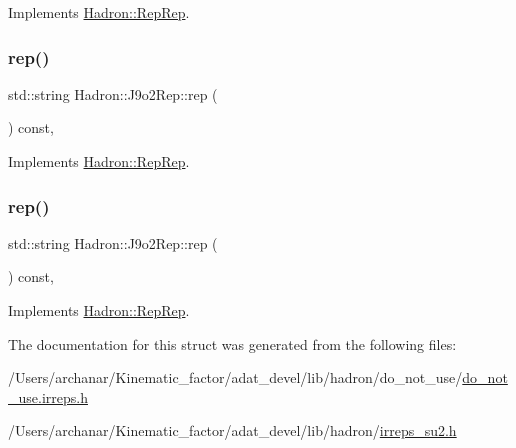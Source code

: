 Implements \mbox{\hyperlink{structHadron_1_1RepRep_ab3213025f6de249f7095892109575fde}{Hadron\+::\+Rep\+Rep}}.

\mbox{\label{structHadron_1_1J9o2Rep_ad83e9b0b6221fcaeeeed5f2653890334}} 
\subsubsection{\texorpdfstring{rep()}{rep()}\hspace{0.1cm}{\footnotesize\ttfamily [2/3]}}
{\footnotesize\ttfamily std\+::string Hadron\+::\+J9o2\+Rep\+::rep (\begin{DoxyParamCaption}{ }\end{DoxyParamCaption}) const\hspace{0.3cm}{\ttfamily [inline]}, {\ttfamily [virtual]}}



Implements \mbox{\hyperlink{structHadron_1_1RepRep_ab3213025f6de249f7095892109575fde}{Hadron\+::\+Rep\+Rep}}.

\mbox{\label{structHadron_1_1J9o2Rep_ad83e9b0b6221fcaeeeed5f2653890334}} 
\subsubsection{\texorpdfstring{rep()}{rep()}\hspace{0.1cm}{\footnotesize\ttfamily [3/3]}}
{\footnotesize\ttfamily std\+::string Hadron\+::\+J9o2\+Rep\+::rep (\begin{DoxyParamCaption}{ }\end{DoxyParamCaption}) const\hspace{0.3cm}{\ttfamily [inline]}, {\ttfamily [virtual]}}



Implements \mbox{\hyperlink{structHadron_1_1RepRep_ab3213025f6de249f7095892109575fde}{Hadron\+::\+Rep\+Rep}}.



The documentation for this struct was generated from the following files\+:\begin{DoxyCompactItemize}
\item 
/\+Users/archanar/\+Kinematic\+\_\+factor/adat\+\_\+devel/lib/hadron/do\+\_\+not\+\_\+use/\mbox{\hyperlink{do__not__use_8irreps_8h}{do\+\_\+not\+\_\+use.\+irreps.\+h}}\item 
/\+Users/archanar/\+Kinematic\+\_\+factor/adat\+\_\+devel/lib/hadron/\mbox{\hyperlink{lib_2hadron_2irreps__su2_8h}{irreps\+\_\+su2.\+h}}\end{DoxyCompactItemize}
